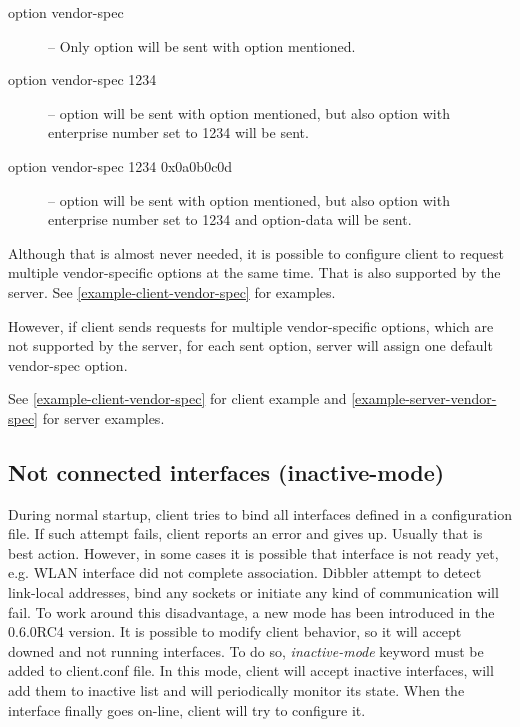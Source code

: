 \begin{description}
\item[option vendor-spec] -- Only  option will be sent
  with  option mentioned.
\item[option vendor-spec 1234] --  option will be sent
  with  option mentioned, but also  option with enterprise number set to 1234 will be sent.
\item[option vendor-spec 1234 0x0a0b0c0d] --  option will be sent
  with  option mentioned, but also
 option with enterprise number set to 1234 and
option-data will be sent.
\end{description}

Although that is almost never needed, it is possible to configure
client to request multiple vendor-specific options at the same
time. That is also supported by the server. See
\ref{example-client-vendor-spec} for examples.


However, if client sends requests for multiple vendor-specific
options, which are not supported by the server, for each sent option,
server will assign one default vendor-spec option.

See \ref{example-client-vendor-spec} for client example and
\ref{example-server-vendor-spec} for server examples.

\subsection{Not connected interfaces (inactive-mode)}
\label{feature-inactive-mode}
During normal startup, client tries to bind all interfaces defined in
a configuration file. If such attempt fails, client reports an error
and gives up. Usually that is best action. However, in some cases it
is possible that interface is not ready yet, e.g. WLAN interface did
not complete association. Dibbler attempt to detect link-local
addresses, bind any sockets or initiate any kind of communication will
fail. To work around this disadvantage, a new mode has been
introduced in the 0.6.0RC4 version. It is possible to modify client
behavior, so it will accept downed and not running interfaces. To do
so, \emph{inactive-mode} keyword must be added to client.conf file. In
this mode, client will accept inactive interfaces, will add them to
inactive list and will periodically monitor its state. When the
interface finally goes on-line, client will try to configure it.

